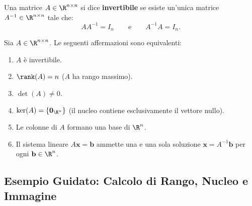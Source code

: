\begin{definition}
Una matrice $A \in \R^{n \times n}$ si dice \textbf{invertibile} se esiste un'unica matrice $A^{-1} \in \R^{n \times n}$ tale che:
\begin{equation}
    A A^{-1} = I_n \qquad \text{e} \qquad A^{-1} A = I_n.
\end{equation}
\end{definition}

\begin{theorem}
Sia $A \in \R^{n \times n}$. Le seguenti affermazioni sono equivalenti:
\mbox{}\par\nopagebreak
\begin{enumerate}
    \item $A$ \`e invertibile.
    \item $\rank(A) = n$ ($A$ ha rango massimo).
    \item $\det(A) \neq 0$.
    \item $\ker(A) = \{ \mathbf{0}_{\R^n} \}$ (il nucleo contiene esclusivamente il vettore nullo).
    \item Le colonne di $A$ formano una base di $\R^n$.
    \item Il sistema lineare $A\mathbf{x} = \mathbf{b}$ ammette una e una sola soluzione $\mathbf{x} = A^{-1}\mathbf{b}$ per ogni $\mathbf{b} \in \R^n$.
\end{enumerate}
\end{theorem}

\subsection{Esempio Guidato: Calcolo di Rango, Nucleo e Immagine}


